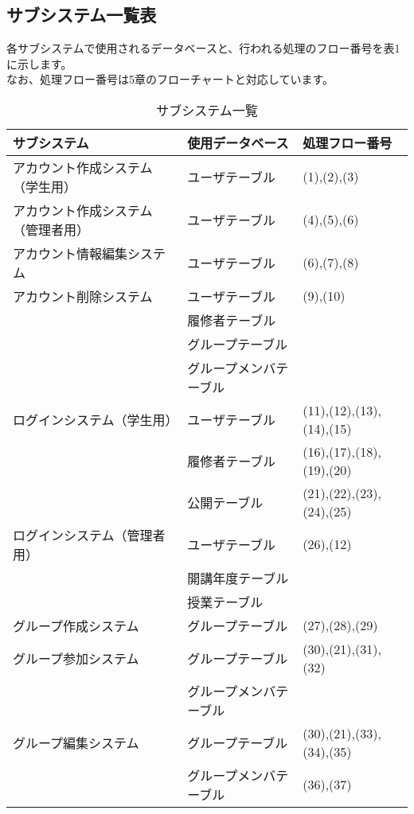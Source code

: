 \subsection{サブシステム一覧表}
各サブシステムで使用されるデータベースと、行われる処理のフロー番号を表1に示します。\\
なお、処理フロー番号は5章のフローチャートと対応しています。
\begin{table}[h]
		\centering
		\caption{サブシステム一覧}
		\label{サブシステム一覧}
		\begin{tabular}{|l|l|l|}
		\hline
		サブシステム & 使用データベース  & 処理フロー番号\\ \hline\hline
		アカウント作成システム（学生用） & ユーザテーブル & (1),(2),(3)\\ \hline
		アカウント作成システム（管理者用） & ユーザテーブル & (4),(5),(6)\\ \hline
		アカウント情報編集システム & ユーザテーブル & (6),(7),(8)\\ \hline
		アカウント削除システム & ユーザテーブル & (9),(10)\\ \cline{2-2}
                        & 履修者テーブル & \\ \cline{2-2}
                        & グループテーブル & \\ \cline{2-2}
                        & グループメンバテーブル & \\ \hline
		ログインシステム（学生用） & ユーザテーブル & (11),(12),(13),(14),(15)\\ \cline{2-2}
		                        & 履修者テーブル & (16),(17),(18),(19),(20)\\ \cline{2-2}
                            & 公開テーブル & (21),(22),(23),(24),(25)\\ \hline
    ログインシステム（管理者用） & ユーザテーブル & (26),(12)\\ \cline{2-2}
		                        & 開講年度テーブル & \\ \cline{2-2}
                            & 授業テーブル & \\ \hline
    グループ作成システム & グループテーブル & (27),(28),(29)\\ \hline
    グループ参加システム & グループテーブル & (30),(21),(31),(32)\\ \cline{2-2}
                      & グループメンバテーブル & \\ \hline
    グループ編集システム & グループテーブル & (30),(21),(33),(34),(35)\\ \cline{2-2}
                      & グループメンバテーブル & (36),(37)\\ \hline

\end{tabular}
\end{table}
